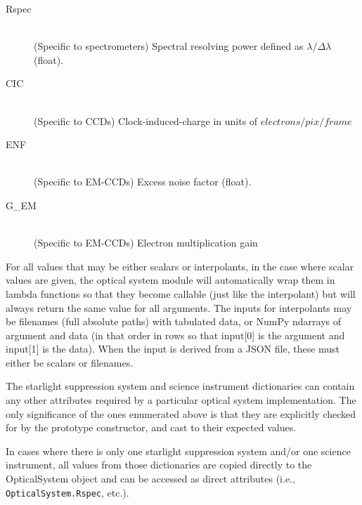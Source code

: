 \documentclass[cleanfoot]{asme2ej}
\begin{document}
\begin{itemize}
\begin{description}
\begin{description}
    \item[Rspec] \hfill \\
    (Specific to spectrometers) Spectral resolving power defined as $\lambda/\Delta\lambda$ (float). 
    \item[CIC] \hfill \\
    (Specific to CCDs) Clock-induced-charge in units of $ electrons/pix/frame $
    \item[ENF] \hfill \\
    (Specific to EM-CCDs) Excess noise factor (float).
    \item[G\_EM] \hfill \\
    (Specific to EM-CCDs) Electron multiplication gain    \end{description}
\end{description}
\end{itemize}
For all values that may be either scalars or interpolants, in the case where scalar values are given, the optical system module will automatically wrap them in lambda functions so that they become callable (just like the interpolant) but will always return the same value for all arguments.  The inputs for interpolants may be filenames (full absolute paths) with tabulated data, or NumPy ndarrays of argument and data (in that order in rows so that input[0] is the argument and input[1] is the data).  When the input is derived from a JSON file, these must either be scalars or filenames.

The starlight suppression system and science instrument dictionaries can contain any other attributes required by a particular optical system implementation.  The only significance of the ones enumerated above is that they are explicitly checked for by the prototype constructor, and cast to their expected values.

In cases where there is only one starlight suppression system and/or one science instrument, all values from those dictionaries are copied directly to the OpticalSystem object and can be accessed as direct attributes (i.e., \verb+OpticalSystem.Rspec+, etc.).
\end{document}
